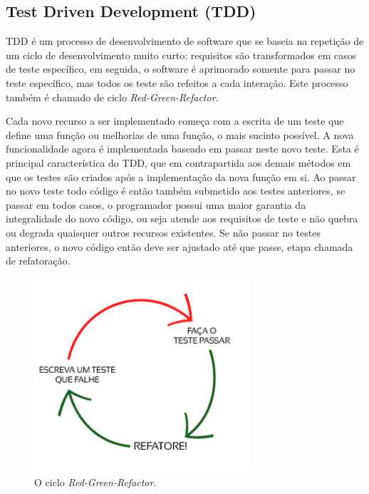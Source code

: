 \subsection{Test Driven Development (TDD)}
\par TDD é um processo de desenvolvimento de software que se baseia na repetição de um ciclo de desenvolvimento muito curto: requisitos são transformados em casos de teste específico, em seguida, o software é aprimorado somente para passar no teste específico, mas todos os teste são refeitos a cada interação. Este processo também é chamado de ciclo \emph{Red-Green-Refactor}.
\par Cada novo recurso a ser implementado começa com a escrita de um teste que define uma função ou melhorias de uma função, o mais sucinto possível. A nova funcionalidade agora é implementada baseado em passar neste novo teste. Esta é principal característica do TDD, que em contrapartida aos demais métodos em que os testes são criados após a implementação da nova função em si. Ao passar no novo teste todo código é então também submetido aos testes anteriores, se passar em todos casos, o programador possui uma maior garantia da integralidade do novo código, ou seja atende aos requisitos de teste e não quebra ou degrada quaisquer outros recursos existentes. Se não passar no testes anteriores, o novo código então deve ser ajustado até que passe, etapa chamada de refatoração.
\begin{figure}[!htb]
\centering
\includegraphics[width=8cm]{figuras/red_green}
\caption{\label{fig:red_green}O ciclo \emph{Red-Green-Refactor}.}
\end{figure}
